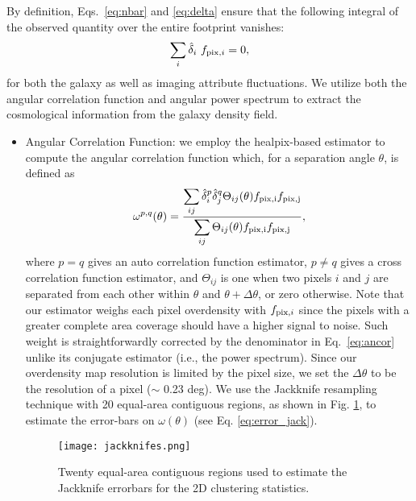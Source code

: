 \documentclass[fleqn, usenatbib]{mnras}
\begin{document}
By definition, Eqs.~\ref{eq:nbar} and \ref{eq:delta} ensure that the following integral of the observed quantity over the entire footprint vanishes:
\begin{align}\label{eq:ic}
    \sum_{i} \hat{\delta}_{i}~f_{{\rm pix},i} = 0,
\end{align}
for both the galaxy as well as imaging attribute fluctuations. We utilize both the angular correlation function and angular power spectrum to extract the cosmological information from the galaxy density field.


\begin{itemize}
    \item Angular Correlation Function: we employ the healpix-based estimator to compute the angular correlation function which, for a separation angle $\theta$, is defined as \citep[see e.g.][]{scranton2002analysis,ross2011ameliorating}
    \begin{align}
        \omega^{p,q} (\theta) = \frac{\displaystyle\sum_{ij} \hat{\delta}^{p}_{i} \hat{\delta}^{q}_{j} \Theta_{ij}(\theta) f_{\rm pix, i}f_{\rm pix, j}}{\displaystyle\sum_{ij} \Theta_{ij}(\theta) f_{\rm pix, i}f_{\rm pix, j}},\label{eq:ancor}
    \end{align}
    where $p=q$ gives an auto correlation function estimator, $p\neq q$ gives a cross correlation function estimator, and $\Theta_{ij}$ is one when two pixels $i$ and $j$ are separated from each other within $\theta$ and $\theta+\Delta\theta$, or zero otherwise. Note that our estimator weighs each pixel overdensity with $f_{{\rm pix}, i}$ since the pixels with a greater complete area coverage should have a higher signal to noise. Such weight is straightforwardly corrected by the denominator in Eq.~\ref{eq:ancor} unlike its conjugate estimator (i.e., the power spectrum). Since our overdensity map resolution is limited by the pixel size, we set the $\Delta\theta$ to be the resolution of a pixel ($\sim$ 0.23 deg). We use the Jackknife resampling technique with 20 equal-area contiguous regions, as shown in Fig. \ref{fig:jackknifes}, to estimate the error-bars on $\omega (\theta)$ (see Eq. \ref{eq:error_jack}). \\
    \begin{figure}
        \centering
        \texttt{[image: jackknifes.png]}
        \caption{Twenty equal-area contiguous regions used to estimate the Jackknife errorbars for the 2D clustering statistics.}
        \label{fig:jackknifes}
    \end{figure}



\end{itemize}
\end{document}
